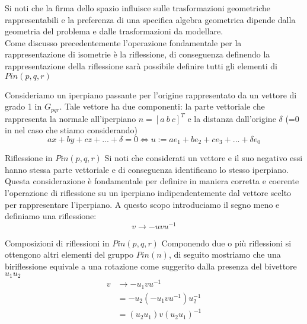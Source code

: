 \begin{frame}
    Si noti che la firma dello spazio influisce sulle trasformazioni geometriche rappresentabili e la preferenza di una specifica algebra geometrica dipende dalla geometria del problema e dalle trasformazioni da modellare.\\
   Come discusso precedentemente l’operazione fondamentale per la rappresentazione di isometrie è la riflessione, di conseguenza definendo la rappresentazione della riflessione sarà possibile definire tutti gli elementi di \(Pin(p,q,r)\)
\end{frame}

\begin{frame}
    Consideriamo un iperpiano passante per l’origine rappresentato da un vettore di grado 1 in \(G_{pqr}\). 
   Tale vettore ha due componenti: la parte vettoriale che rappresenta la normale all’iperpiano \(n=[a\ b\ c]^{T}\) e la distanza dall’origine \(\delta\) (=0 in nel caso che stiamo considerando)
   \[
      ax+by+cz+...+\delta =0 \iff u:= ae_1+be_2+ce_3+...+\delta e_0
   \]
\end{frame}

\begin{frame}{Riflessione in \(Pin(p,q,r)\)}
   Si noti che considerati un vettore e il suo negativo essi hanno stessa parte vettoriale e di conseguenza identificano lo stesso iperpiano. 
   Questa considerazione è fondamentale per definire in maniera corretta e coerente l’operazione di riflessione su un iperpiano indipendentemente dal vettore scelto per rappresentare l’iperpiano.
   A questo scopo introduciamo il segno meno e definiamo una riflessione:
   \begin{equation}
      v\to -uvu^{-1}
   \end{equation}
\end{frame}

\begin{frame}{Composizioni di riflessioni in \(Pin(p,q,r)\)}
   Componendo due o più riflessioni si ottengono altri elementi del gruppo \(Pin(n)\), di seguito mostriamo che una biriflessione equivale a una rotazione come suggerito dalla presenza del bivettore \(u_{1}u_{2}\)
   \[
   \begin{aligned}
      v &\to -u_1vu^{-1}\\
      &=-u_2(-u_1vu^{-1})u_2^{-1}\\
      &=(u_2u_1)v(u_2u_1)^{-1}
   \end{aligned}
   \]
\end{frame}


